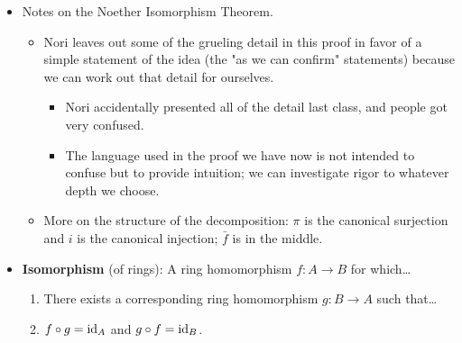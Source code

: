 \documentclass[../notes.tex]{subfiles}
\begin{document}
\begin{itemize}
\begin{proof}
        If we ignore $\times$ and regard $A,B$ as additive abelian groups, the FIT applies and yields the above (unique) factorization. In it, $\bar{f}$ is a bijective additive isomorphism (group homomorphism). Thus, this takes care of proving that $\bar{f}$ respects addition.\par
        We now just need to prove that $\bar{f}$ respects multiplication and sends 1 to 1 to complete our verification that it is a ring homomorphism. We will do this indirectly. First, observe that $f$ is a ring homomorphism and $i$ is an injective ring homomorphism. Thus, $\bar{f}\circ\pi=i^{-1}\circ f$ is a ring homomorphism (as we can confirm). This combined with the fact that $\pi$ is onto implies that $\bar{f}$ is a ring homomorphism (as we can confirm).\par
        This essentially completes our proof; we just need the formal definition of an isomorphism of rings to take it to the finish line.
    \end{proof}
    \item Notes on the Noether Isomorphism Theorem.
    \begin{itemize}
        \item Nori leaves out some of the grueling detail in this proof in favor of a simple statement of the idea (the "as we can confirm" statements) because we can work out that detail for ourselves.
        \begin{itemize}
            \item Nori accidentally presented all of the detail last class, and people got very confused.
            \item The language used in the proof we have now is not intended to confuse but to provide intuition; we can investigate rigor to whatever depth we choose.
        \end{itemize}
        \item More on the structure of the decomposition: $\pi$ is the canonical surjection and $i$ is the canonical injection; $\bar{f}$ is in the middle.
    \end{itemize}
    \item \textbf{Isomorphism} (of rings): A ring homomorphism $f:A\to B$ for which\dots
    \begin{enumerate}[label={(\roman*)}]
        \item There exists a corresponding ring homomorphism $g:B\to A$ such that\dots
        \item $f\circ g=\operatorname{id}_A$ and $g\circ f=\operatorname{id}_B$.
    \end{enumerate}

\end{itemize}
\end{document}
